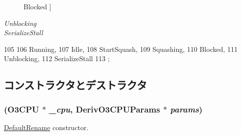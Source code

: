 \begin{Desc}
\begin{description}
{{Blocked}
\label{classDefaultRename_ae2739961013a00cede621d4d72f2173ca9463ee9b8700258a1019b4b9d2d77a30}
}]\item[{\em 
\hypertarget{classDefaultRename_ae2739961013a00cede621d4d72f2173caf2a3acf850890cb1651bc41dcbacb7e0}{
Unblocking}
\label{classDefaultRename_ae2739961013a00cede621d4d72f2173caf2a3acf850890cb1651bc41dcbacb7e0}
}]\item[{\em 
\hypertarget{classDefaultRename_ae2739961013a00cede621d4d72f2173caca0d28c09e2dcdb3aec968eda81d65f3}{
SerializeStall}
\label{classDefaultRename_ae2739961013a00cede621d4d72f2173caca0d28c09e2dcdb3aec968eda81d65f3}
}]\end{description}
\end{Desc}




\begin{DoxyCode}
105                       {
106         Running,
107         Idle,
108         StartSquash,
109         Squashing,
110         Blocked,
111         Unblocking,
112         SerializeStall
113     };
\end{DoxyCode}


\subsection{コンストラクタとデストラクタ}
\hypertarget{classDefaultRename_a6035d792bb85b9f4c301d53c20885dfc}{
\subsubsection[{DefaultRename}]{ ({\bf O3CPU} $\ast$ {\em \_\-cpu}, \/  DerivO3CPUParams $\ast$ {\em params})}}
\label{classDefaultRename_a6035d792bb85b9f4c301d53c20885dfc}
\hyperlink{classDefaultRename}{DefaultRename} constructor. 


